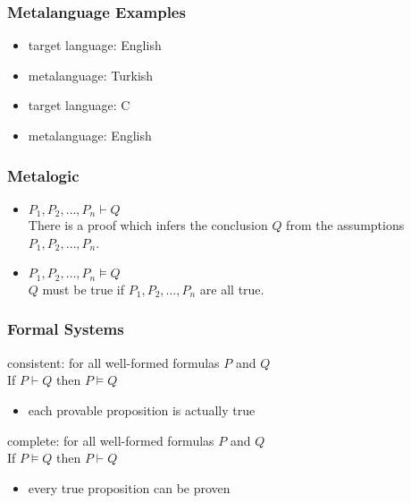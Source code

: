 \documentclass[dvipsnames]{beamer}
\begin{document}
\begin{frame}
  \frametitle{Metalanguage Examples}

  \begin{example}
    \begin{itemize}
      \item target language: English
      \item metalanguage: Turkish
    \end{itemize}
  \end{example}

  \pause
  \begin{example}
    \begin{itemize}
      \item target language: C
      \item metalanguage: English
    \end{itemize}
  \end{example}
\end{frame}

\begin{frame}
  \frametitle{Metalogic}

  \begin{itemize}
    \item $P_1,P_2,\dots,P_n \vdash Q$\\
      There is a proof which infers the conclusion $Q$ from the assumptions
      $P_1,P_2,\dots,P_n$.

    \pause
    \medskip
    \item $P_1,P_2,\dots,P_n \vDash Q$\\
      $Q$ must be true if $P_1,P_2,\dots,P_n$ are all true.
  \end{itemize}
\end{frame}

\begin{frame}
  \frametitle{Formal Systems}

  \begin{definition}
    \alert{consistent}: for all well-formed formulas $P$ and $Q$\\
      If $P \vdash Q$ then $P \vDash Q$

    \begin{itemize}
      \item each provable proposition is actually true
    \end{itemize}
  \end{definition}

  \pause
  \begin{definition}
    \alert{complete}: for all well-formed formulas $P$ and $Q$\\
      If $P \vDash Q$ then $P \vdash Q$
    \begin{itemize}
      \item every true proposition can be proven
    \end{itemize}
  \end{definition}
\end{frame}
\end{document}
